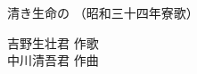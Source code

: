 \documentclass[10pt,b5j]{tarticle} %
\begin{document}
\begin{minipage}[c]{0.7\hsize} %
    \begin{center}
        {\LARGE
            清き生命の %
        }
        {\small 
            （昭和三十四年寮歌） %
        }
    \end{center}
\end{minipage}
\begin{minipage}[c]{0.3\hsize} %
    \begin{flushright} %
        吉野生壮君 作歌\\中川清吾君 作曲 %
    \end{flushright}
\end{minipage}
\end{document}
